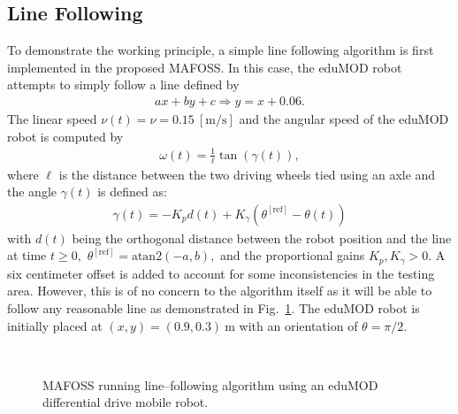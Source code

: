 \subsection{Line Following}
To demonstrate the working principle, a simple line following algorithm is first implemented in the proposed MAFOSS. In this case, the eduMOD robot attempts to simply follow a line defined by 
\begin{align*}
    ax +by+c \Rightarrow y = x + 0.06. 
\end{align*}
The linear speed $\nu(t) = \nu = 0.15~[\si{\meter\per\second}]$ and the angular speed of the eduMOD robot is computed by %
%
\begin{align*}
  \omega(t) = \frac{1}{\ell}\tan(\gamma(t)),
\end{align*}
%
where  $\ell$ is the distance between the two driving wheels tied using an axle and the angle $\gamma(t)$ is defined as: %
%
\begin{align*}
  \gamma(t) = -K_pd(t)+K_\gamma (\theta^{[\mathrm{ref}]} - \theta(t))
\end{align*}
%
with $d(t)$ being the orthogonal distance between the robot position and the line at time $t\ge 0,$ $\theta^{[\mathrm{ref}]} = \mathrm{atan2}(-a,b),$ and the proportional gains $K_p,K_\gamma>0.$
%
A six centimeter offset is added to account for some inconsistencies in the testing area. However, this is of no concern to the algorithm itself as it will be able to follow any reasonable line as demonstrated in Fig.~\ref{fig:trajectoryLineFollowerPictures}.  The eduMOD robot is initially placed at $(x,y) = (0.9, 0.3)~\si{\meter}$ with an orientation of $\theta = {\pi}/2$. %
%
\begin{figure}
    \centering
    \\
    \caption{MAFOSS running line--following algorithm using an eduMOD differential drive mobile robot.}
    \label{fig:trajectoryLineFollowerPictures}
\end{figure}
